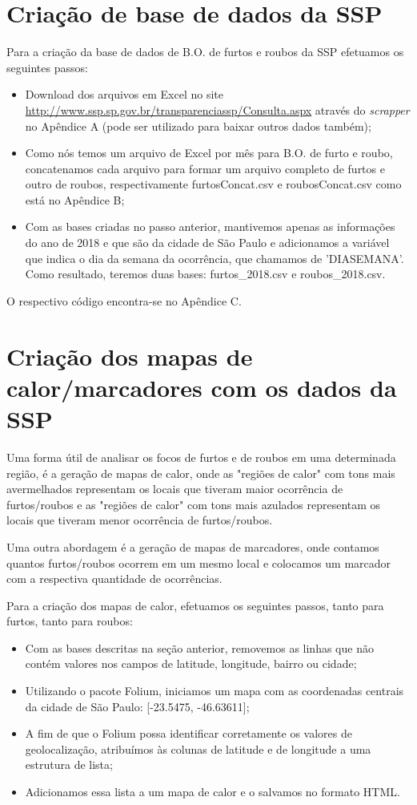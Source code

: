 \documentclass[
	12pt,
	openright,			%
	twoside,			%
	a4paper,			%
	chapter=TITLE,		%
	section=TITLE,		%
	subsection=TITLE,	%
	subsubsection=TITLE,%
	english,			%
	french,				%
	spanish,			%
	brazil				%
	]{abntex2}
\begin{document}
\section{Criação de base de dados da SSP}
Para a criação da base de dados de B.O. de furtos e roubos da SSP efetuamos os seguintes passos:
\begin{itemize}
    \item Download dos arquivos em Excel no site \url{http://www.ssp.sp.gov.br/transparenciassp/Consulta.aspx} através do \textit{scrapper} no Apêndice A (pode ser utilizado para baixar outros dados também);
    \item Como nós temos um arquivo de Excel por mês para B.O. de furto e roubo, concatenamos cada arquivo para formar um arquivo completo de furtos e outro de roubos, respectivamente furtosConcat.csv e roubosConcat.csv como está no Apêndice B;
    \item Com as bases criadas no passo anterior, mantivemos apenas as informações do ano de 2018 e que são da cidade de São Paulo e adicionamos a variável que indica o dia da semana da ocorrência, que chamamos de 'DIASEMANA'. Como resultado, teremos duas bases: furtos\_2018.csv e roubos\_2018.csv.
\end{itemize}

O respectivo código encontra-se no Apêndice C.

\section{Criação dos mapas de calor/marcadores com os dados da SSP}
Uma forma útil de analisar os focos de furtos e de roubos em uma determinada região, é a geração de mapas de calor, onde as "regiões de calor" com tons mais avermelhados representam os locais que tiveram maior ocorrência de furtos/roubos e as "regiões de calor" com tons mais azulados representam os locais que tiveram menor ocorrência de furtos/roubos.

Uma outra abordagem é a geração de mapas de marcadores, onde contamos quantos furtos/roubos ocorrem em um mesmo local e colocamos um marcador com a respectiva quantidade de ocorrências.

Para a criação dos mapas de calor, efetuamos os seguintes passos, tanto para furtos, tanto para roubos:
\begin{itemize}
    \item Com as bases descritas na seção anterior, removemos as linhas que não contém valores nos campos de latitude, longitude, bairro ou cidade;
    \item Utilizando o pacote Folium, iniciamos um mapa com as coordenadas centrais da cidade de São Paulo: [-23.5475, -46.63611];
    \item A fim de que o Folium possa identificar corretamente os valores de geolocalização, atribuímos às colunas de latitude e de longitude a uma estrutura de lista;
    \item Adicionamos essa lista a um mapa de calor e o salvamos no formato HTML.
\end{itemize}
\end{document}
